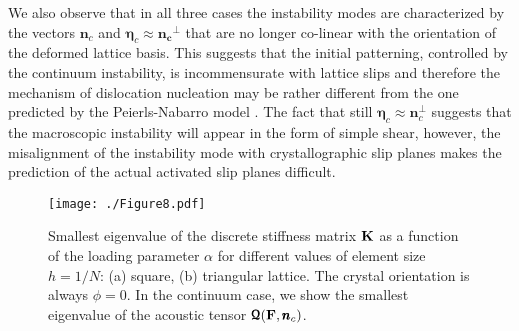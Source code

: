 \documentclass[CRPHYS,Unicode,manuscript]{cedram}
\begin{document}
We also observe that  in all three cases the instability modes are  characterized by the vectors $\pmb{n}_c $ and $ \pmb{\eta}_c\approx\pmb{n_c}^\perp$  that are no longer co-linear  with the orientation of the deformed lattice basis. This suggests that the initial patterning,  controlled by the  continuum instability,   is incommensurate with lattice slips and therefore the  mechanism of dislocation  nucleation   may be rather different from the one predicted  by the Peierls-Nabarro model \cite{Nabarro2002-js}. The fact that still $\pmb{\eta}_c\approx\pmb{n}_c^\perp$  suggests that the macroscopic instability   will appear in the form of simple shear, however,  the misalignment of the instability mode with  crystallographic slip planes makes the prediction of the actual activated slip planes  difficult. 

\begin{figure}[h!]
\centering
\texttt{[image: ./Figure8.pdf]}
\caption{\scriptsize {Smallest eigenvalue of the discrete stiffness  matrix ${\bf K}$ as a function of the loading parameter $\alpha$ for different values of element size $h=1/N$: (a) square, (b) triangular lattice.   The  crystal orientation is always $\phi=0$.  In the continuum case,  we  show  the smallest eigenvalue of the  acoustic tensor  $\pmb{\mathcal Q}({\bf F},\pmb{n}_c)$.}
 \label{fig:smalleigen}}
\end{figure}



%
%
\end{document}

